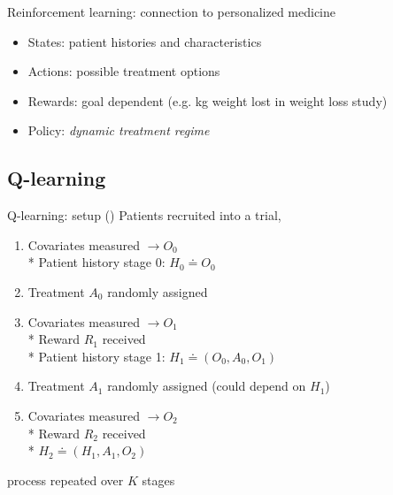 \documentclass{beamer}
\begin{document}
\begin{frame}[c]{Reinforcement learning: connection to personalized medicine}
  
  \begin{itemize}[<+->]
      \item States: patient histories and characteristics
      \item Actions: possible treatment options
      \item Rewards: goal dependent (e.g. kg weight lost in weight loss study)
      \item Policy: \emph{dynamic treatment regime} 
  \end{itemize}

\end{frame}

\subsection{Q-learning} %
\label{sub:q_learning}

\begin{frame}{Q-learning: setup (\cite{dtr-review})}
  Patients recruited into a trial,
  \begin{enumerate}[<+(1)->]
    \item Covariates measured $\rightarrow O_{0}$ \\*
    Patient history stage 0: $H_{0} \doteq O_{0}$
    \item Treatment $A_{0}$ randomly assigned
    \item Covariates measured $\rightarrow O_{1}$ \\*
    Reward $R_{1}$ received \\*
    Patient history stage 1: $H_{1} \doteq (O_{0}, A_{0}, O_{1})$
    \item Treatment $A_{1}$ randomly assigned (could depend on $H_{1}$)
    \item Covariates measured $\rightarrow O_{2}$ \\*
    Reward $R_{2}$ received \\*
    $H_{2} \doteq (H_{1}, A_{1}, O_{2})$
  \end{enumerate}
    \pause
    process repeated over $K$ stages
\end{frame}
\end{document}

